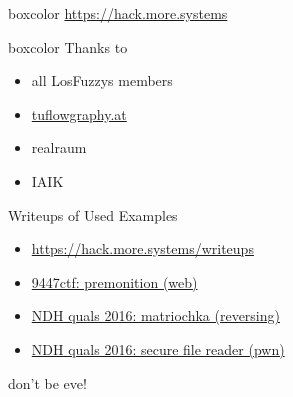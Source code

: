 {
\begin{frame}[plain]

  \begin{center}
  	\begin{beamercolorbox}[sep=0.5em,wd=10cm]{boxcolor}
	    \color{white}
	    {\huge \url{https://hack.more.systems}}
	\end{beamercolorbox}
  \end{center}

  \vspace{3em}


  \begin{beamercolorbox}[sep=1em,wd=5cm]{boxcolor}
    Thanks to

    \begin{itemize}
      \item all LosFuzzys members
      \item \url{tuflowgraphy.at}
      \item realraum
      \item IAIK
    \end{itemize}
  \end{beamercolorbox}

\end{frame}
}

\begin{frame}
  {Writeups of Used Examples}

  \begin{itemize}
    \item \url{https://hack.more.systems/writeups}
  \end{itemize}

  \begin{itemize}
    \item
      \href{http://losfuzzys.github.io/writeup/2015/12/07/9447ctf-premonition/}
      {9447ctf: premonition (web)}
    \item \href{https://losfuzzys.github.io/writeup/2016/04/04/ndhquals2016-matriochka/}
      {NDH quals 2016: matriochka (reversing)}
    \item \href{https://losfuzzys.github.io/writeup/2016/04/04/ndhquals2016-secure-file-reader/}
      {NDH quals 2016: secure file reader (pwn)}
  \end{itemize}
  
  \vspace{3em}
  
  don't be eve!

\end{frame}
